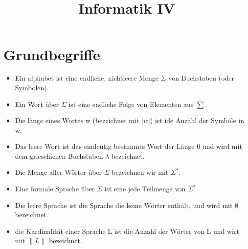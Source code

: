 \documentclass[9pt]{article}
\title{Informatik IV}
\author{}
\begin{document}

\section{Grundbegriffe}
\begin{itemize}
	\item Ein alphabet ist eine endliche, nichtleere Menge $\Sigma$ von Buchstaben  (oder Symbolen).
	\item Ein Wort über $\Sigma$ ist eine endliche Folge von Elementen aus $\sum$.
	\item Die länge eines Wortes w (bezeichnet mit $|w|$) ist ide Anzahl der Symbole in w.
	\item Das leere Wort ist das eindeutig bestimmte Wort der Länge 0 und wird mit dem grieschichen Buchstaben $\lambda$ bezeichnet.
	\item Die Menge aller Wörter über $\Sigma$ bezeichnen wir mit $\Sigma^*$.
	\item Eine formale Sprache über $\Sigma$ ist eine jede Teilmenge von $\Sigma^*$
	\item Die leere Sprache ist die Sprache die keine Wörter enthält, und wird mit $\emptyset$ bezeichnet.
	\item die Kardinalität einer Sprache L ist die Anzahl der Wörter von L und wirt mit $\|L\|$ bezeichnet.
\end{itemize}
\end{document}
